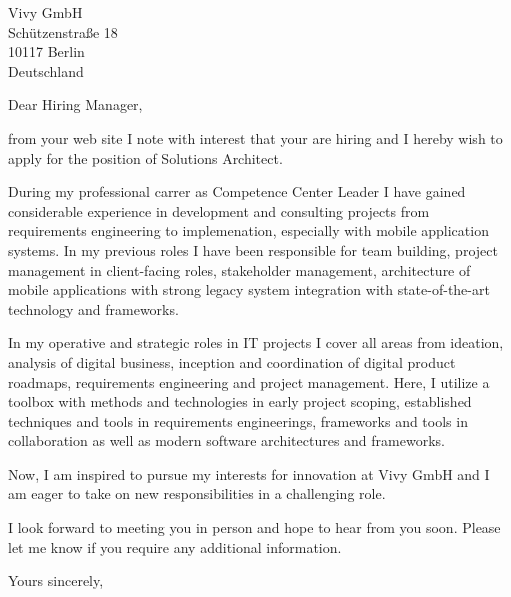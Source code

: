 \documentclass[10pt,a4paper]{dinbrief}
\date{\today}
\begin{document}
 
\begin{letter}  
{%
	Vivy GmbH\\
	Schützenstraße 18\\
	10117 Berlin\\
	Deutschland
}
\subject{\bf Job Application Solutions Architect}
\opening{Dear Hiring Manager,}

from your web site I note with interest that your are  hiring and I hereby wish to apply for the position of Solutions Architect. 

During my professional carrer as Competence Center Leader I have gained considerable experience in development and consulting projects from requirements engineering to implemenation, especially with mobile application systems. In my previous roles I have been responsible for team building, project management in client-facing roles, stakeholder management, architecture of mobile applications with strong legacy system integration with state-of-the-art technology and frameworks.

In my operative and strategic roles in IT projects I cover all areas from ideation, analysis of digital business, inception and coordination of digital product roadmaps, requirements engineering and project management. Here, I utilize a toolbox with methods and technologies in early project scoping, established techniques and tools in requirements engineerings, frameworks and tools in collaboration as well as modern software architectures and frameworks.

Now, I am inspired to pursue my interests for innovation at Vivy GmbH and I am eager to take on new responsibilities in a challenging role.

I look forward to meeting you in person and hope to hear from you soon. Please let me know if you require any additional information.

\closing{Yours sincerely,}
\end{letter}
\end{document}

